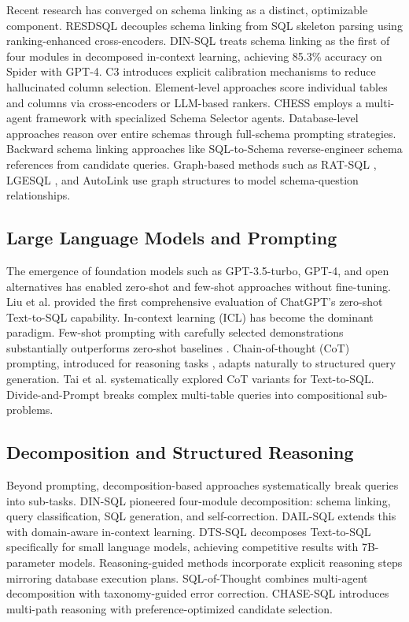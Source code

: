 \documentclass[conference]{IEEEtran}
\begin{document}
Recent research has converged on schema linking as a distinct, optimizable component. RESDSQL \cite{c9} decouples schema linking from SQL skeleton parsing using ranking-enhanced cross-encoders. DIN-SQL \cite{b13} treats schema linking as the first of four modules in decomposed in-context learning, achieving 85.3\% accuracy on Spider with GPT-4. C3 \cite{c10} introduces explicit calibration mechanisms to reduce hallucinated column selection. Element-level approaches score individual tables and columns via cross-encoders or LLM-based rankers. CHESS \cite{c11} employs a multi-agent framework with specialized Schema Selector agents. Database-level approaches reason over entire schemas through full-schema prompting strategies. Backward schema linking approaches like SQL-to-Schema \cite{c12} reverse-engineer schema references from candidate queries. Graph-based methods such as RAT-SQL \cite{c13}, LGESQL \cite{c14}, and AutoLink \cite{c15} use graph structures to model schema-question relationships.

\subsection{Large Language Models and Prompting}

The emergence of foundation models such as GPT-3.5-turbo, GPT-4, and open alternatives has enabled zero-shot and few-shot approaches without fine-tuning. Liu et al. \cite{c16} provided the first comprehensive evaluation of ChatGPT's zero-shot Text-to-SQL capability. In-context learning (ICL) has become the dominant paradigm. Few-shot prompting with carefully selected demonstrations substantially outperforms zero-shot baselines \cite{c17, c18}. Chain-of-thought (CoT) prompting, introduced for reasoning tasks \cite{c19}, adapts naturally to structured query generation. Tai et al. \cite{c20} systematically explored CoT variants for Text-to-SQL. Divide-and-Prompt \cite{c21} breaks complex multi-table queries into compositional sub-problems.

\subsection{Decomposition and Structured Reasoning}

Beyond prompting, decomposition-based approaches systematically break queries into sub-tasks. DIN-SQL pioneered four-module decomposition: schema linking, query classification, SQL generation, and self-correction. DAIL-SQL \cite{c22} extends this with domain-aware in-context learning. DTS-SQL \cite{c23} decomposes Text-to-SQL specifically for small language models, achieving competitive results with 7B-parameter models. Reasoning-guided methods incorporate explicit reasoning steps mirroring database execution plans. SQL-of-Thought \cite{c24} combines multi-agent decomposition with taxonomy-guided error correction. CHASE-SQL \cite{c25} introduces multi-path reasoning with preference-optimized candidate selection.
\end{document}
